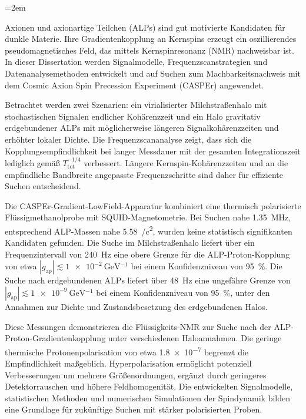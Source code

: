 \begingroup
\emergencystretch=2em

Axionen und axionartige Teilchen (ALPs) sind gut motivierte Kandidaten für dunkle Materie. Ihre Gradientenkopplung an Kernspins erzeugt ein oszillierendes pseudomagnetisches Feld, das mittels Kernspinresonanz (NMR) nachweisbar ist.
In dieser Dissertation werden Signalmodelle, Frequenzscanstrategien und Datenanalysemethoden entwickelt und auf Suchen zum Machbarkeitsnachweis mit dem Cosmic Axion Spin Precession Experiment (CASPEr) angewendet.

Betrachtet werden zwei Szenarien: ein virialisierter Milchstraßenhalo mit stochastischen Signalen endlicher Kohärenzzeit und ein Halo gravitativ erdgebundener ALPs mit möglicherweise längeren Signalkohärenzzeiten und erhöhter lokaler Dichte.
Die Frequenzscananalyse zeigt, dass sich die Kopplungsempfindlichkeit bei langer Messdauer mit der gesamten Integrationszeit lediglich gemäß $T_\mathrm{tot}^{-1/4}$ verbessert. Längere Kernspin-Kohärenzzeiten und an die empfindliche Bandbreite angepasste Frequenzschritte sind daher für effiziente Suchen entscheidend.

Die CASPEr-Gradient-LowField-Apparatur kombiniert eine thermisch polarisierte Flüssigmethanolprobe mit SQUID-Magnetometrie.
Bei Suchen nahe \SI{1.35}{\MHz}, entsprechend ALP-Massen nahe \SI{5.58}{\neV/c^2}, wurden keine statistisch signifikanten Kandidaten gefunden.
Die Suche im Milchstraßenhalo liefert über ein Frequenzintervall von \SI{240}{\Hz} eine obere Grenze für die ALP-Proton-Kopplung von etwa $|g_\mathrm{ap}|\lesssim\SI{1e-2}{\GeV^{-1}}$ bei einem Konfidenzniveau von \SI{95}{\percent}.
Die Suche nach erdgebundenen ALPs liefert über \SI{48}{\Hz} eine ungefähre Grenze von $|g_\mathrm{ap}|\lesssim\SI{1e-9}{\GeV^{-1}}$ bei einem Konfidenzniveau von \SI{95}{\percent}, unter den Annahmen zur Dichte und Zustandsbesetzung des erdgebundenen Halos.

Diese Messungen demonstrieren die Flüssigkeits-NMR zur Suche nach der ALP-Proton-Gradientenkopplung unter verschiedenen Haloannahmen.
Die geringe thermische Protonenpolarisation von etwa \num{1.8e-7} begrenzt die Empfindlichkeit maßgeblich. Hyperpolarisation ermöglicht potenziell Verbesserungen um mehrere Größenordnungen, ergänzt durch geringeres Detektorrauschen und höhere Feldhomogenität.
Die entwickelten Signalmodelle, statistischen Methoden und numerischen Simulationen der Spindynamik bilden eine Grundlage für zukünftige Suchen mit stärker polarisierten Proben.
\par\endgroup
